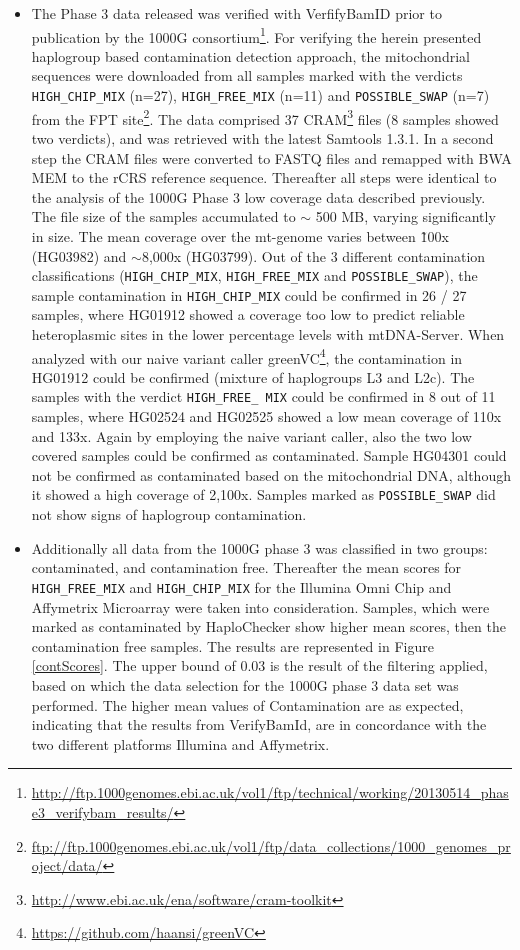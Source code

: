 \begin{itemize}
\item The Phase 3 data released was verified with VerfifyBamID prior to publication by the 1000G consortium\footnote{\url{http://ftp.1000genomes.ebi.ac.uk/vol1/ftp/technical/working/20130514_phase3_verifybam_results/}}. For verifying the herein presented haplogroup based contamination detection approach, the mitochondrial sequences were downloaded from all samples marked with the verdicts \verb|HIGH_CHIP_MIX| (n=27), \verb|HIGH_FREE_MIX| (n=11) and \verb|POSSIBLE_SWAP| (n=7) from the FPT site\footnote{\url{ftp://ftp.1000genomes.ebi.ac.uk/vol1/ftp/data_collections/1000_genomes_project/data/}}. The data comprised 37 CRAM\footnote{\url{http://www.ebi.ac.uk/ena/software/cram-toolkit}} files (8 samples showed two verdicts), and was retrieved with the latest Samtools 1.3.1. In a second step the CRAM files were converted to FASTQ files and remapped with BWA MEM to the rCRS reference sequence. Thereafter all steps were identical to the analysis of the 1000G Phase 3 low coverage data described previously.
The file size of the samples accumulated to $\sim$ 500 MB, varying significantly in size. The mean coverage over the mt-genome varies between \~100x (HG03982) and $\sim$8,000x (HG03799). Out of the 3 different contamination classifications (\verb|HIGH_CHIP_MIX|, \verb|HIGH_FREE_MIX| and \verb|POSSIBLE_SWAP|), the sample contamination in \verb|HIGH_CHIP_MIX| could be confirmed in 26 / 27 samples, where HG01912 showed a coverage too low to predict reliable heteroplasmic sites in the lower percentage levels with mtDNA-Server. When analyzed with our naive variant caller greenVC\footnote{\url{https://github.com/haansi/greenVC}}, the contamination in HG01912 could be confirmed (mixture of haplogroups L3 and L2c). The samples with the verdict \verb|HIGH_FREE_ MIX| could be confirmed in 8  out of 11 samples, where HG02524 and HG02525 showed a low mean coverage of 110x and 133x. Again by employing the naive variant caller, also the two low covered samples could be confirmed as contaminated. Sample HG04301 could not be confirmed as contaminated based on the mitochondrial DNA, although it showed a high coverage of 2,100x. Samples marked as \verb|POSSIBLE_SWAP| did not show signs of haplogroup contamination.
\item Additionally all data from the 1000G phase 3 was classified in two groups: contaminated, and contamination free. Thereafter the mean scores for  \verb|HIGH_FREE_MIX| and \verb|HIGH_CHIP_MIX| for the Illumina Omni Chip and Affymetrix Microarray were taken into consideration. Samples, which were marked as contaminated by HaploChecker show higher mean scores, then the contamination free samples. The results are represented in Figure \ref{contScores}. The upper bound of 0.03 is the result of the filtering applied, based on which the data selection for the 1000G phase 3 data set was performed. The higher mean values of Contamination are as expected, indicating that the results from VerifyBamId, are in concordance with the two different platforms Illumina and Affymetrix.

\end{itemize}
